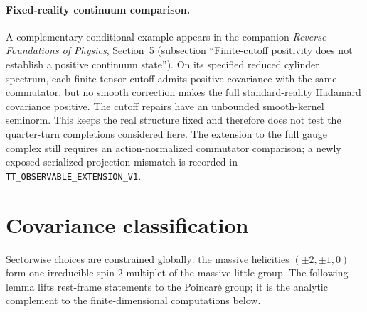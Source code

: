 \documentclass[11pt]{article}
\theoremstyle{definition}
\theoremstyle{remark}
\begin{document}
\paragraph{Fixed-reality continuum comparison.}
A complementary conditional example appears in the companion
\emph{Reverse Foundations of Physics}, Section~5 (subsection
``Finite-cutoff positivity does not establish a positive continuum state'').
On its specified reduced cylinder spectrum, each finite tensor cutoff admits
positive covariance with the same commutator, but no smooth correction makes
the full standard-reality Hadamard covariance positive. The cutoff repairs
have an unbounded smooth-kernel seminorm. This keeps the real structure fixed
and therefore does not test the quarter-turn completions considered here.
The extension to the full gauge complex still requires an action-normalized
commutator comparison; a newly exposed serialized projection mismatch is
recorded in \texttt{TT\_OBSERVABLE\_EXTENSION\_V1}.

\section{Covariance classification}\label{sec:covariance}

Sectorwise choices are constrained globally: the massive helicities
$(\pm2,\pm1,0)$ form one irreducible spin-$2$ multiplet of the massive
little group.  The following lemma lifts rest-frame statements to the
Poincar\'e group; it is the analytic complement to the finite-dimensional
computations below.
\end{document}
